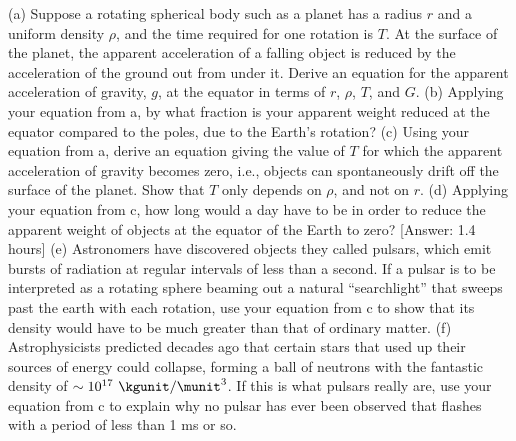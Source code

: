 (a) Suppose a rotating spherical body such as a planet
has a radius $r$ and a uniform density $\rho $, and the time
required for one rotation is $T$. At the surface of the
planet, the apparent acceleration of a falling object is
reduced by the acceleration of the ground out from under it.
Derive an equation for the apparent acceleration of gravity,
$g$, at the equator in terms of $r$, $\rho$, $T$, and $G$.\answercheck\hwendpart
(b) Applying your equation from a, by what fraction is
your apparent weight reduced at the equator compared to the
poles, due to the Earth's rotation?\answercheck\hwendpart
(c) Using your equation from a, derive an equation giving
the value of $T$ for which the apparent acceleration of
gravity becomes zero, i.e., objects can spontaneously drift
off the surface of the planet. Show that $T$ only depends on
$\rho $, and not on $r$.\answercheck\hwendpart
(d) Applying your equation from c, how long would a day
have to be in order to reduce the apparent weight of objects
at the equator of the Earth to zero? [Answer: 1.4 hours]\hwendpart
(e) Astronomers have discovered objects
they called pulsars, which emit bursts of radiation at
regular intervals of less than a second. If a pulsar is to
be interpreted as a rotating sphere beaming out a natural
``searchlight'' that sweeps past the earth with each
rotation, use your equation from c to show that its
density would have to be much greater than that of ordinary matter.\hwendpart
(f) Astrophysicists predicted decades ago that
certain stars that used up their sources of energy could
collapse, forming a ball of neutrons with the fantastic
density of $\sim10^{17}\ \kgunit/\munit^3$. If this is what pulsars
really are, use your equation from c to explain why no
pulsar has ever been observed that flashes with a period of
less than 1 ms or so.
